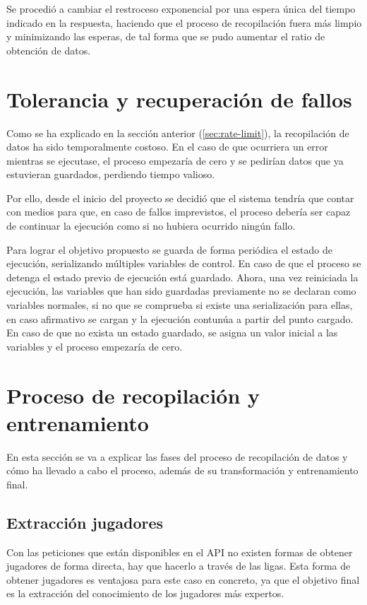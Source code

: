 Se procedió a cambiar el restroceso exponencial por una espera única del tiempo indicado en la respuesta, haciendo que el proceso de recopilación fuera más limpio y minimizando las esperas, de tal forma que se pudo aumentar el ratio de obtención de datos.

\section{Tolerancia y recuperación de fallos}\label{sec:fault-tolerance}
Como se ha explicado en la sección anterior (\ref{sec:rate-limit}), la recopilación de datos ha sido temporalmente costoso. En el caso de que ocurriera un error mientras se ejecutase, el proceso empezaría de cero y se pedirían datos que ya estuvieran guardados, perdiendo tiempo valioso.

Por ello, desde el inicio del proyecto se decidió que el sistema tendría que contar con medios para que, en caso de fallos imprevistos, el proceso debería ser capaz de continuar la ejecución como si no hubiera ocurrido ningún fallo.

Para lograr el objetivo propuesto se guarda de forma periódica el estado de ejecución, serializando múltiples variables de control. En caso de que el proceso se detenga el estado previo de ejecución está guardado. Ahora, una vez reiniciada la ejecución, las variables que han sido guardadas previamente no se declaran como variables normales, si no que se comprueba si existe una serialización para ellas, en caso afirmativo se cargan y la ejecución contunúa a partir del punto cargado. En caso de que no exista un estado guardado, se asigna un valor inicial a las variables y el proceso empezaría de cero.

\section{Proceso de recopilación y entrenamiento}
En esta sección se va a explicar las fases del proceso de recopilación de datos y cómo ha llevado a cabo el proceso, además de su transformación y entrenamiento final.

\subsection{Extracción jugadores}
Con las peticiones que están disponibles en el API no existen formas de obtener jugadores de forma directa, hay que hacerlo a través de las ligas. Esta forma de obtener jugadores es ventajosa para este caso en concreto, ya que el objetivo final es la extracción del conocimiento de los jugadores más expertos.

